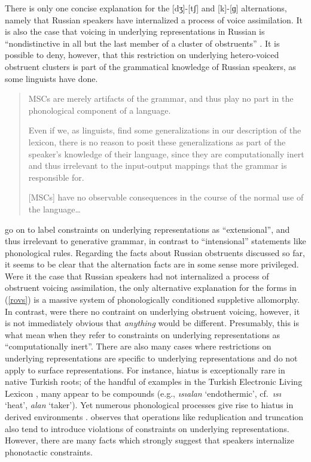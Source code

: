 There is only one concise explanation for the [dʒ]-[tʃ] and [k]-[ɡ] alternations, namely that Russian speakers have internalized a process of voice assimilation.
It is also the case that voicing in underlying representations in Russian is ``nondistinctive in all but the last member of a cluster of obstruents'' \citep[283]{A74}.
It is possible to deny, however, that this restriction on underlying hetero-voiced obstruent clusters is part of the grammatical knowledge of Russian speakers, as some linguists have done.

\begin{quote}
MSCs are merely artifacts of the grammar, and thus play no part in the phonological component of a language. \citep[302]{Clayton1976}

Even if we, as linguists, find some generalizations in our description of the lexicon, there is no reason to posit these generalizations as part of the speaker's knowledge of their language, since they are computationally inert and thus irrelevant to the input-output mappings that the grammar is responsible for. \citep[17f.]{PE}

[MSCs] have no observable consequences in the course of the normal use of the language\ldots{} \citep[320]{Zimmer1969}
\end{quote}

\noindent
\citeauthor{PE} go on to label constraints on underlying representations as ``extensional'', and thus irrelevant to generative grammar, in contrast to ``intensional'' statements like phonological rules.
Regarding the facts about Russian obstruents discussed so far, it seems to be clear that the alternation facts are in some sense more privileged.
Were it the case that Russian speakers had not internalized a process of obstruent voicing assimilation, the only alternative explanation for the forms in (\ref{rovs}) is a massive system of phonologically conditioned suppletive allomorphy.
In contrast, were there no contraint on underlying obstruent voicing, however, it is not immediately obvious that \emph{anything} would be different. 
Presumably, this is what \citeauthor{PE} mean when they refer to constraints on underlying representations as ``computationally inert''.
There are also many cases where restrictions on underlying representations are specific to underlying representations and do not apply to surface representations.
For instance, hiatus is exceptionally rare in native Turkish roots; of the handful of examples in the Turkish Electronic Living Lexicon \citep{TELL}, many appear to be compounds (e.g., \emph{ısıalan} `endothermic', cf.~\emph{ısı} `heat', \emph{alan} `taker').
Yet numerous phonological processes give rise to hiatus in derived environments \citep[e.g.,][]{Kabak2007b}.
\citet{Silverman2000} observes that operations like reduplication and truncation also tend to introduce violations of constraints on underlying representations.
However, there are many facts which strongly suggest that speakers internalize phonotactic constraints.

